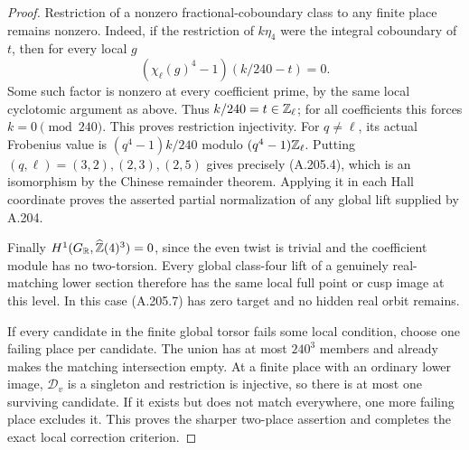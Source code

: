 \begin{proof}
Restriction of a nonzero fractional-coboundary class to
any finite place remains nonzero.  Indeed, if the restriction
of \(k\eta_4\) were the integral coboundary of \(t\),
then for every local \(g\)
\[
       (\chi_\ell(g)^4-1)(k/240-t)=0.
\tag{A.205.15}
\]
Some such factor is nonzero at every coefficient prime,
by the same local cyclotomic argument as above.  Thus
\(k/240=t\in\mathbb Z_\ell\); for all coefficients this forces
\(k=0\pmod {240}\).  This proves restriction injectivity.
For \(q\ne\ell\), its actual Frobenius value is
\((q^4-1)k/240\) modulo \((q^4-1)\mathbb Z_\ell\).
Putting \((q,\ell)=(3,2),(2,3),(2,5)\) gives precisely
(A.205.4), which is an isomorphism by the Chinese
remainder theorem.  Applying it in each Hall coordinate
proves the asserted partial normalization of any global
lift supplied by A.204.

Finally \(H^1(G_\mathbb R,\widehat{\mathbb Z}(4)^3)=0\), since the
even twist is trivial and the coefficient module has no
two-torsion.  Every global class-four lift of a genuinely
real-matching lower section therefore has the same local
full point or cusp image at this level.  In this case
(A.205.7) has zero target and no hidden real orbit remains.

If every candidate in the finite global torsor fails
some local condition, choose one failing place per
candidate.  The union has at most \(240^3\) members
and already makes the matching intersection empty.
At a finite place with an ordinary lower image,
\(\mathcal D_v\) is a singleton and restriction is
injective, so there is at most one surviving candidate.
If it exists but does not match everywhere, one more
failing place excludes it.  This proves the sharper
two-place assertion and completes the exact local
correction criterion.
\end{proof}
